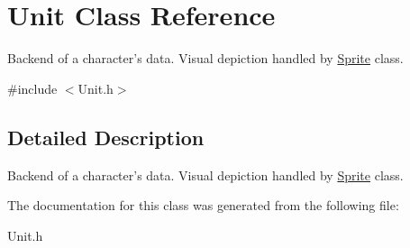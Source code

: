 \hypertarget{class_unit}{}\section{Unit Class Reference}
\label{class_unit}


Backend of a character’s data. Visual depiction handled by \hyperlink{class_sprite}{Sprite} class.  




{\ttfamily \#include $<$Unit.\+h$>$}



\subsection{Detailed Description}
Backend of a character’s data. Visual depiction handled by \hyperlink{class_sprite}{Sprite} class. 

The documentation for this class was generated from the following file\+:\begin{DoxyCompactItemize}
\item 
Unit.\+h\end{DoxyCompactItemize}

